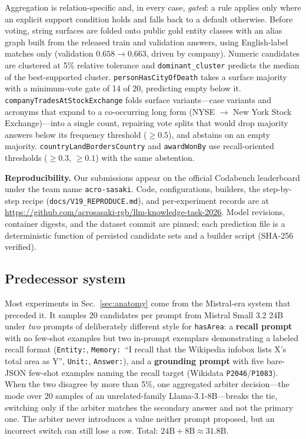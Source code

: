 \documentclass[11pt]{article}
\begin{document}
Aggregation is relation-specific and, in every case, \emph{gated}: a rule
applies only where an explicit support condition holds and falls back to
a default otherwise. Before voting, string surfaces are folded onto
public gold entity classes with an alias graph built from the released
train and validation answers, using English-label matches only
(validation $0.658\rightarrow0.663$, driven by company). Numeric
candidates are clustered at 5\% relative tolerance and
\texttt{dominant\_cluster} predicts the median of the best-supported
cluster. \texttt{personHasCityOfDeath} takes a surface majority with a
minimum-vote gate of 14 of 20, predicting empty below it.
\texttt{companyTradesAtStockExchange} folds surface variants---case
variants and acronyms that expand to a co-occurring long form (NYSE
$\rightarrow$ New York Stock Exchange)---into a single count, repairing
vote splits that would drop majority answers below its frequency
threshold ($\ge0.5$), and abstains on an empty majority. \texttt{countryLandBordersCountry} and \texttt{awardWonBy} use
recall-oriented thresholds ($\ge0.3$, $\ge0.1$) with the same abstention.

\textbf{Reproducibility.} Our submissions appear on the official
Codabench leaderboard under the team name \texttt{acro-sasaki}. Code,
configurations, builders, the step-by-step recipe
(\texttt{docs/V19\_REPRODUCE.md}), and per-experiment records are at
\url{https://github.com/acrosasaki-rgb/llm-knowledge-task-2026}. Model
revisions, container digests, and the dataset commit are pinned; each
prediction file is a deterministic function of persisted candidate sets
and a builder script (SHA-256 verified).

\subsection{Predecessor system}

Most experiments in Sec.~\ref{sec:anatomy} come from the Mistral-era
system that preceded it. It samples 20 candidates per prompt from Mistral
Small 3.2 24B under \emph{two} prompts of deliberately different style
for \texttt{hasArea}: a \textbf{recall prompt} with no few-shot examples
but two in-prompt exemplars demonstrating a labeled recall format
(\texttt{Entity:}, \texttt{Memory:}\ ``I recall that the Wikipedia
infobox lists X's total area as Y'', \texttt{Unit:}, \texttt{Answer:}),
and a \textbf{grounding prompt} with five bare-JSON few-shot examples
naming the recall target (Wikidata \texttt{P2046}/\texttt{P1083}). When
the two disagree by more than 5\%, one aggregated arbiter decision---the
mode over 20 samples of an unrelated-family Llama-3.1-8B---breaks the
tie, switching only if the arbiter matches the secondary answer and not
the primary one. The arbiter never introduces a value neither prompt
proposed, but an incorrect switch can still lose a row. Total:
$24\text{B}+8\text{B}\approx31.8\text{B}$.
\end{document}
